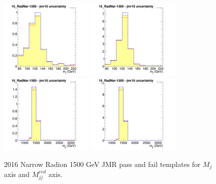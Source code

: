 \begin{figure}[!htb]
	\centering
	\includegraphics[width=0.4\textwidth]{Figures/Uncertainty_16_RadNar-1500_jmr16failX.png}
	\includegraphics[width=0.4\textwidth]{Figures/Uncertainty_16_RadNar-1500_jmr16passX.png}
	\includegraphics[width=0.4\textwidth]{Figures/Uncertainty_16_RadNar-1500_jmr16failY.png}
	\includegraphics[width=0.4\textwidth]{Figures/Uncertainty_16_RadNar-1500_jmr16passY.png}
	\caption{2016 Narrow Radion 1500 GeV JMR pass and fail templates for $M_j$ axis and $M_{jj}^{red}$ axis.}
	\label{fig:jerRadionAppend}
\end{figure}
